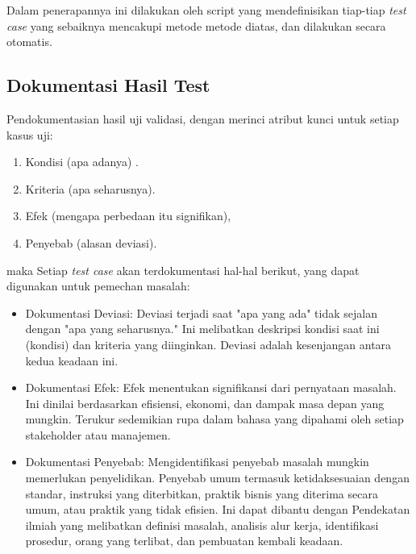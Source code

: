 \documentclass[12pt]{article}
\begin{document}
Dalam penerapannya ini dilakukan oleh script yang mendefinisikan tiap-tiap \emph{test case} yang sebaiknya mencakupi metode metode diatas, dan dilakukan secara otomatis.



\subsection*{Dokumentasi Hasil Test}
Pendokumentasian hasil uji validasi, dengan merinci atribut kunci untuk setiap kasus uji: 

\begin{enumerate}
   \item Kondisi (apa adanya) .
   \item Kriteria (apa seharusnya). 
   \item Efek (mengapa perbedaan itu signifikan), 
   \item Penyebab (alasan deviasi). 
   
\end{enumerate}
maka Setiap \emph{test case} akan terdokumentasi hal-hal berikut, yang dapat digunakan untuk pemechan masalah:
\begin{itemize}
   
   \item Dokumentasi Deviasi: Deviasi terjadi saat "apa yang ada" tidak sejalan dengan "apa yang seharusnya." Ini melibatkan deskripsi kondisi saat ini (kondisi) dan kriteria yang diinginkan. Deviasi adalah kesenjangan antara kedua keadaan ini.
   
   \item Dokumentasi Efek: Efek menentukan signifikansi dari pernyataan masalah. Ini dinilai berdasarkan efisiensi, ekonomi, dan dampak masa depan yang mungkin. Terukur sedemikian rupa dalam bahasa yang dipahami oleh setiap stakeholder atau manajemen.
   
   \item Dokumentasi Penyebab: Mengidentifikasi penyebab masalah mungkin memerlukan penyelidikan. Penyebab umum termasuk ketidaksesuaian dengan standar, instruksi yang diterbitkan, praktik bisnis yang diterima secara umum, atau praktik yang tidak efisien. Ini dapat dibantu dengan  Pendekatan ilmiah yang melibatkan definisi masalah, analisis alur kerja, identifikasi prosedur, orang yang terlibat, dan pembuatan kembali keadaan.
   
\end{itemize}
\end{document}
